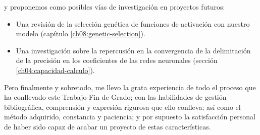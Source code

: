 y proponemos como posibles vías de investigación en proyectos futuros: 

\begin{itemize}
    \item Una revisión de la selección genética de funciones de activación con nuestro modelo (capítulo \ref{ch08:genetic-selection}).
    \item Una investigación sobre la repercusión en la convergencia de la delimitación de la precisión en los coeficientes de las redes neuronales (sección \ref{ch04:capacidad-calculo}). 
\end{itemize}

Pero finalmente y sobretodo, me llevo la grata experiencia de 
todo el proceso que ha conllevado este Trabajo Fin de Grado;
con las habilidades de gestión bibliográfica, comprensión y expresión rigurosa que ello conlleva;
así como el método adquirido, constancia y paciencia;
y por supuesto la satisfacción personal de haber sido capaz de acabar un proyecto 
de estas características. 


